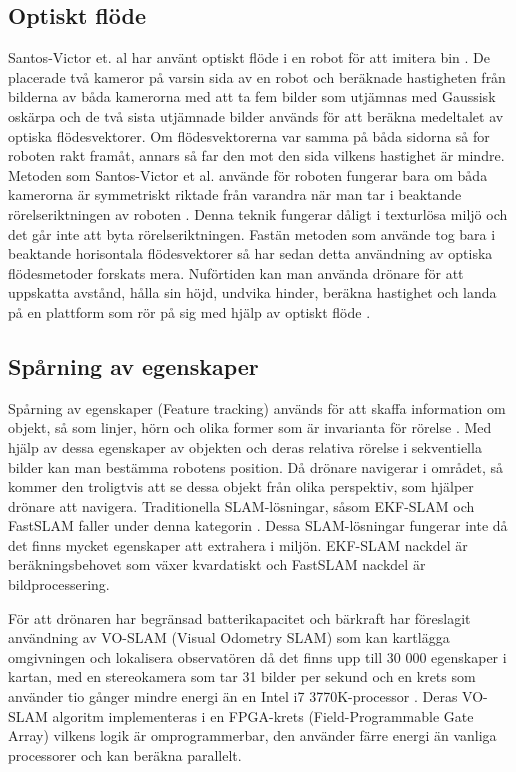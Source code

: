 \subsection{Optiskt flöde}

Santos-Victor et. al har använt optiskt flöde i en robot för att imitera bin \citep{341094}. De placerade två kameror på varsin sida av en robot och beräknade hastigheten från bilderna av båda kamerorna med att ta fem bilder som utjämnas med Gaussisk oskärpa och de två sista utjämnade bilder används för att beräkna medeltalet av optiska flödesvektorer. Om flödesvektorerna var samma på båda sidorna så for roboten rakt framåt, annars så far den mot den sida vilkens hastighet är mindre. Metoden som Santos-Victor et al. använde för roboten fungerar bara om båda kamerorna är symmetriskt riktade från varandra när man tar i beaktande rörelseriktningen av roboten \citep{982903}. Denna teknik fungerar dåligt i texturlösa miljö och det går inte att byta rörelseriktningen. Fastän metoden som \cite{341094} använde tog bara i beaktande horisontala flödesvektorer så har sedan detta användning av optiska flödesmetoder forskats mera. Nuförtiden kan man använda drönare för att uppskatta avstånd, hålla sin höjd, undvika hinder, beräkna hastighet och landa på en plattform som rör på sig med hjälp av optiskt flöde \citep{6564752}.

\subsection{Spårning av egenskaper}

Spårning av egenskaper (Feature tracking) används för att skaffa information om objekt, så som linjer, hörn och olika former som är invarianta för rörelse \citep{geospatial}. Med hjälp av dessa egenskaper av objekten och deras relativa rörelse i sekventiella bilder kan man bestämma robotens position. Då drönare navigerar i området, så kommer den troligtvis att se dessa objekt från olika perspektiv, som hjälper drönare att navigera. Traditionella SLAM-lösningar, såsom EKF-SLAM och FastSLAM faller under denna kategorin \citep{voslamlatif}. Dessa SLAM-lösningar fungerar inte då det finns mycket egenskaper att extrahera i miljön. EKF-SLAM nackdel är beräkningsbehovet som växer kvardatiskt och FastSLAM nackdel är bildprocessering. 

För att drönaren har begränsad batterikapacitet och bärkraft har \cite{voslam} föreslagit användning av VO-SLAM (Visual Odometry SLAM) som kan kartlägga omgivningen och lokalisera observatören då det finns upp till 30 000 egenskaper i kartan, med en stereokamera som tar 31 bilder per sekund och en krets som använder tio gånger mindre energi än en Intel i7 3770K-processor \citep{voslam}. Deras VO-SLAM algoritm implementeras i en FPGA-krets (Field-Programmable Gate Array) vilkens logik är omprogrammerbar, den använder färre energi än vanliga processorer och kan beräkna parallelt. 

